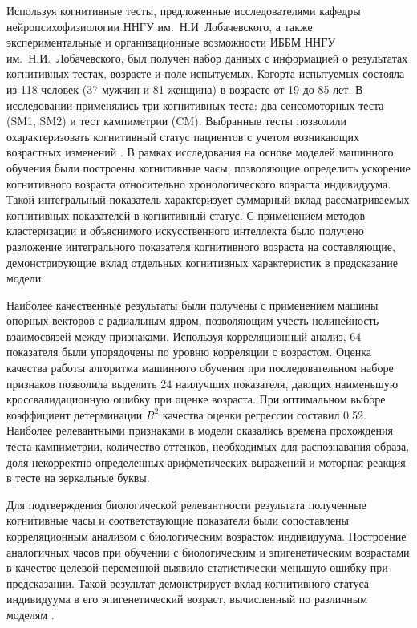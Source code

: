 Используя когнитивные тесты, предложенные исследователями кафедры нейропсихофизиологии ННГУ им.~Н.И~Лобачевского, а также экспериментальные и организационные возможности ИББМ ННГУ им.~Н.И.~Лобачевского, был получен набор данных с информацией о результатах когнитивных тестах, возрасте и поле испытуемых. Когорта испытуемых состояла из 118 человек (37 мужчин и 81 женщина) в возрасте от 19 до 85 лет. В исследовании применялись три когнитивных теста: два сенсомоторных теста (SM1, SM2) и тест кампиметрии (CM). Выбранные тесты позволили охарактеризовать когнитивный статус пациентов с учетом возникающих возрастных изменений \cite{polevaya_eventrelated_2019}. В рамках исследования на основе моделей машинного обучения были построены когнитивные часы, позволяющие определить ускорение когнитивного возраста относительно хронологического возраста индивидуума. Такой интегральный показатель характеризует суммарный вклад рассматриваемых когнитивных показателей в когнитивный статус. С применением методов кластеризации и объяснимого искусственного интеллекта было получено разложение интегрального показателя когнитивного возраста на составляющие, демонстрирующие вклад отдельных когнитивных характеристик в предсказание модели. 

Наиболее качественные результаты были получены с применением машины опорных векторов с радиальным ядром, позволяющим учесть нелинейность взаимосвязей между признаками. Используя корреляционный анализ, 64 показателя были упорядочены по уровню корреляции с возрастом. Оценка качества работы алгоритма машинного обучения при последовательном наборе признаков позволила выделить 24 наилучших показателя, дающих наименьшую кроссвалидационную ошибку при оценке возраста. При оптимальном выборе коэффициент детерминации $R^2$ качества оценки регрессии составил 0.52. Наиболее релевантными признаками в модели оказались времена прохождения теста кампиметрии, количество оттенков, необходимых для распознавания образа, доля некорректно определенных арифметических выражений и моторная реакция в тесте на зеркальные буквы. 

Для подтверждения биологической релевантности результата полученные когнитивные часы и соответствующие показатели были сопоставлены корреляционным анализом с биологическим возрастом индивидуума. Построение аналогичных часов при обучении с биологическим и эпигенетическим возрастами в качестве целевой переменной выявило статистически меньшую ошибку при предсказании. Такой результат демонстрирует вклад когнитивного статуса индивидуума в его эпигенетический возраст, вычисленный по различным моделям \cite{levine_epigenetic_2018,horvath_dna_2013,lu_dna_2019}.


